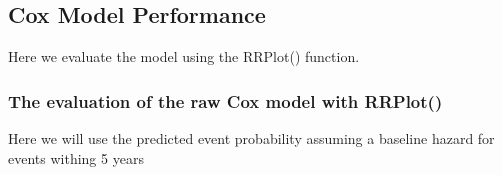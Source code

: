 \documentclass[
]{article}
\newenvironment{Shaded}{\begin{snugshade}}{\end{snugshade}}
\newcommand{\AttributeTok}[1]{\textcolor[rgb]{0.77,0.63,0.00}{#1}}
\newcommand{\CommentTok}[1]{\textcolor[rgb]{0.56,0.35,0.01}{\textit{#1}}}
\newcommand{\DecValTok}[1]{\textcolor[rgb]{0.00,0.00,0.81}{#1}}
\newcommand{\FunctionTok}[1]{\textcolor[rgb]{0.00,0.00,0.00}{#1}}
\newcommand{\NormalTok}[1]{#1}
\newcommand{\OtherTok}[1]{\textcolor[rgb]{0.56,0.35,0.01}{#1}}
\newcommand{\SpecialCharTok}[1]{\textcolor[rgb]{0.00,0.00,0.00}{#1}}
\newcommand{\StringTok}[1]{\textcolor[rgb]{0.31,0.60,0.02}{#1}}
\begin{document}
\hypertarget{cox-model-performance}{%
\subsection{Cox Model Performance}\label{cox-model-performance}}

Here we evaluate the model using the RRPlot() function.

\hypertarget{the-evaluation-of-the-raw-cox-model-with-rrplot}{%
\subsubsection{The evaluation of the raw Cox model with
RRPlot()}\label{the-evaluation-of-the-raw-cox-model-with-rrplot}}

Here we will use the predicted event probability assuming a baseline
hazard for events withing 5 years

\begin{Shaded}
\end{Shaded}
\end{document}
